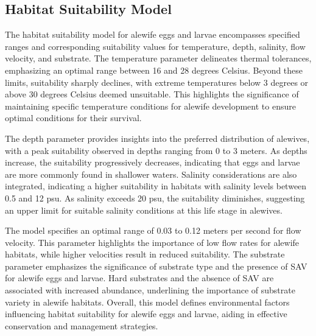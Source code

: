 \documentclass[
]{book}
\begin{document}
\hypertarget{habitat-suitability-model-2}{%
\subsection{Habitat Suitability Model}\label{habitat-suitability-model-2}}

The habitat suitability model for alewife eggs and larvae encompasses specified ranges and corresponding suitability values for temperature, depth, salinity, flow velocity, and substrate. The temperature parameter delineates thermal tolerances, emphasizing an optimal range between 16 and 28 degrees Celsius. Beyond these limits, suitability sharply declines, with extreme temperatures below 3 degrees or above 30 degrees Celsius deemed unsuitable. This highlights the significance of maintaining specific temperature conditions for alewife development to ensure optimal conditions for their survival.

The depth parameter provides insights into the preferred distribution of alewives, with a peak suitability observed in depths ranging from 0 to 3 meters. As depths increase, the suitability progressively decreases, indicating that eggs and larvae are more commonly found in shallower waters. Salinity considerations are also integrated, indicating a higher suitability in habitats with salinity levels between 0.5 and 12 psu. As salinity exceeds 20 psu, the suitability diminishes, suggesting an upper limit for suitable salinity conditions at this life stage in alewives.

The model specifies an optimal range of 0.03 to 0.12 meters per second for flow velocity. This parameter highlights the importance of low flow rates for alewife habitats, while higher velocities result in reduced suitability. The substrate parameter emphasizes the significance of substrate type and the presence of SAV for alewife eggs and larvae. Hard substrates and the absence of SAV are associated with increased abundance, underlining the importance of substrate variety in alewife habitats. Overall, this model defines environmental factors influencing habitat suitability for alewife eggs and larvae, aiding in effective conservation and management strategies.
\end{document}

